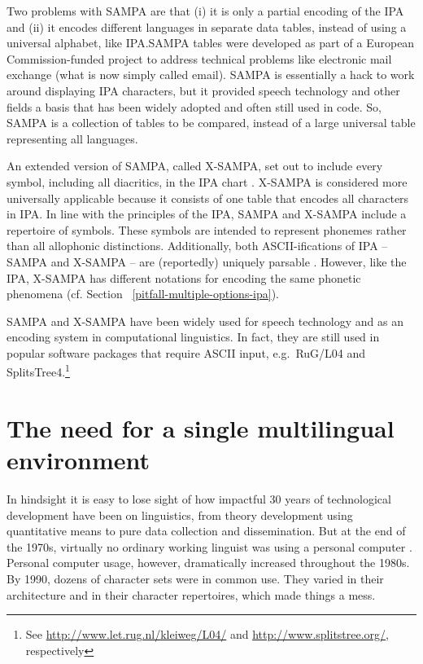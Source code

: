 Two problems with SAMPA are that (i) it is only a partial encoding of the IPA
and (ii) it encodes different languages in separate data tables, instead of
using a universal alphabet, like IPA.\@ SAMPA tables were developed as part of a
European Commission-funded project to address technical problems like electronic
mail exchange (what is now simply called email). SAMPA is essentially a hack to
work around displaying IPA characters, but it provided speech technology and
other fields a basis that has been widely adopted and often still used in code.
So, SAMPA is a collection of tables to be compared, instead of a large universal
table representing all languages. 

An extended version of SAMPA, called X-SAMPA, set out to include every symbol,
including all diacritics, in the IPA chart \citep{Wells1995}. X-SAMPA is
considered more universally applicable because it consists of one table that
encodes all characters in IPA. In line with the principles of the IPA, SAMPA and
X-SAMPA include a repertoire of symbols. These symbols are intended to represent
phonemes rather than all allophonic distinctions. Additionally, both
ASCII-ifications of IPA -- SAMPA and X-SAMPA -- are
(reportedly) uniquely parsable \citep{Wells1995}. However, like the IPA, X-SAMPA
has different notations for encoding the same phonetic phenomena (cf. Section~
\ref{pitfall-multiple-options-ipa}).

SAMPA and X-SAMPA have been widely used for speech technology and as an encoding
system in computational linguistics. In fact, they are still used in popular
software packages that require ASCII input, e.g.~RuG/L04 and SplitsTree4.\footnote{See
\url{http://www.let.rug.nl/kleiweg/L04/} and \url{http://www.splitstree.org/},
respectively}


\section{The need for a single multilingual environment}
\label{need-for-multilingual-environment}

In hindsight it is easy to lose sight of how impactful 30 years of technological
development have been on linguistics, from theory development using quantitative
means to pure data collection and dissemination. But at the end of the 1970s,
virtually no ordinary working linguist was using a personal computer
\citep{Simons1996}. Personal computer usage, however, dramatically increased
throughout the 1980s. By 1990, dozens of character sets were in common use. They
varied in their architecture and in their character repertoires, which made
things a mess. 

